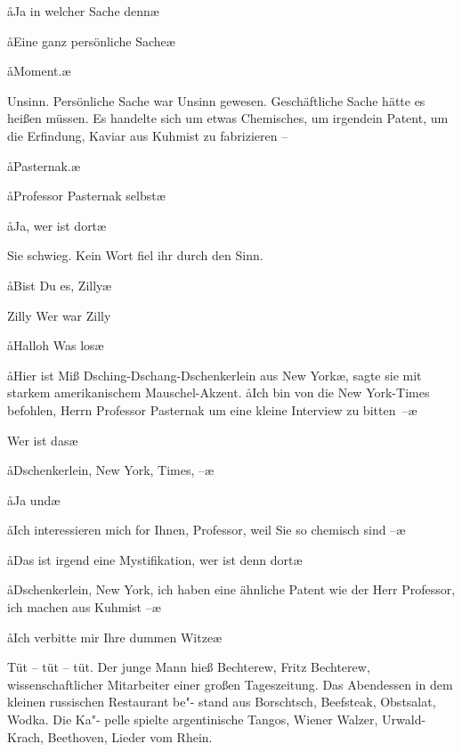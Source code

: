 \aa{}Ja in welcher Sache denn\frag{}\ae{}

\aa{}Eine ganz persönliche Sache\punkte{}\ae{}

\aa{}Moment.\ae{}

Unsinn. Persönliche Sache war Unsinn gewesen. Geschäftliche
Sache hätte es\eingriff{eS47-1}{es ] er} heißen müssen. Es handelte sich um etwas
Chemisches, um irgendein Patent, um die Erfindung, Kaviar
aus Kuhmist zu fabrizieren --

\aa{}Pasternak.\ae{}

\aa{}Professor Pasternak selbst\frag{}\ae{}

\aa{}Ja, wer ist dort\frag{}\ae{}

Sie schwieg. Kein Wort fiel ihr durch den Sinn.

\aa{}Bist Du es, Zilly\frag{}\ae{}

Zilly\frag{} Wer war Zilly\frag{}

\aa{}Halloh\frag{} Was los\frag{}\ae{}

\aa{}Hier ist Miß Dsching-Dschang-Dschenkerlein aus New York\ae{},
sagte sie mit starkem amerikanischem Mauschel-Akzent. \aa{}Ich
bin von die New York-Times befohlen, Herrn Professor
Pasternak um eine kleine Interview zu bitten~--\ae{}

\aanah{}Wer ist das\frag{}\ae{}

\aa{}Dschenkerlein, New York, Times,  --\ae{}

\aa{}Ja und\frag{}\ae{}

\aa{}Ich interessieren mich for Ihnen, Professor, weil Sie so
chemisch sind --\ae{}

\aa{}Das ist irgend eine Mystifikation, wer ist denn dort\frag{}\ae{}

\aa{}Dschenkerlein, New York, ich haben eine ähnliche Patent
wie der Herr Professor, ich machen \label{lS47-1} aus Kuhmist --\ae{}

\aa{}Ich verbitte mir Ihre dummen Witze\ausr{}\ae{}

Tüt -- tüt -- tüt.
\abstand{}
Der junge Mann hieß Bechterew, \label{lS48-1} Fritz Bechterew,
wissenschaftlicher Mitarbeiter einer großen Tageszeitung.
Das Abendessen in dem kleinen russischen Restaurant be"-%
stand aus Borschtsch, Beefsteak, Obstsalat, Wodka. Die Ka"-%
pelle spielte argentinische Tangos, Wiener Walzer, Urwald-%
Krach, Beethoven,  Lieder vom
Rhein.

